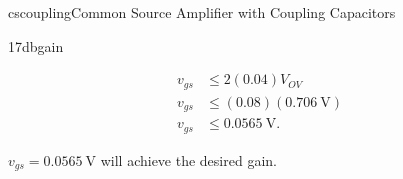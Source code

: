 \begin{mainquestion}{cscoupling}{Common Source Amplifier with Coupling Capacitors}
\begin{partquestion}{17dbgain}
\begin{answer}
\begin{align*}
v_{gs} &\leq 2(0.04)V_{OV}\\
v_{gs} &\leq (0.08)(\qty{0.706}{\volt})\\
v_{gs} &\leq \qty{0.0565}{\volt}.
\end{align*}

$v_{gs} = \qty{0.0565}{\volt}$ will achieve the desired gain.
\end{answer}
\end{partquestion}

\end{mainquestion}
